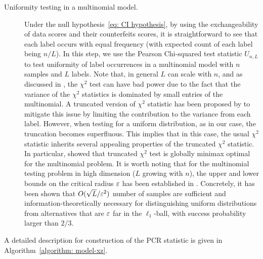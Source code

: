\documentclass[11pt]{article}
\begin{document}
\begin{description}
\item[Uniformity testing in a multinomial model.] Under the null hypothesis~\eqref{eq: CI hypothesis}, by using the exchangeability of data scores and their counterfeits scores, it is straightforward to see that each label occurs with equal frequency (with expected count of each label  being $n/L$). In this step, we use the Pearson Chi-squared test statistic $U_{n,L}$ to test uniformity of label occurrences in a multinomial model with $n$ samples and $L$ labels. Note that, in general $L$ can scale with $n$, and as discussed in  \cite{balakrishnan2019hypothesis}, the $\chi^2$ test can have bad power due to the fact that the variance of the $\chi^2$ statistics is dominated by small entries of the multinomial. A truncated version of $\chi^2$ statistic has been proposed by \cite{balakrishnan2019hypothesis} to mitigate this issue by limiting the contribution to the variance from each label. However, when testing for a uniform distribution, as in our case, the truncation becomes superfluous. This implies that in this case, the usual $\chi^2$ statistic inherits several appealing properties of the truncated $\chi^2$ statistic. In particular, \cite{balakrishnan2019hypothesis} showed that
truncated $\chi^2$ test is globally minimax optimal for the multinomial problem. It is worth noting that for the multinomial testing problem in high dimension ($L$ growing with $n$), the upper and lower bounds on the  critical radius ${\varepsilon}$ has been established in \cite{paninski2008coincidence, valiant2017automatic}. 
Concretely,    
it has been shown that $O(\sqrt{L}/{\varepsilon}^2)$ number of samples are sufficient and information-theoretically necessary for distinguishing uniform distributions from alternatives that are ${\varepsilon}$ far in the $\ell_1$-ball, with success probability larger than $2/3$. 
\end{description}

A detailed description for construction of the PCR statistic is given in Algorithm~\ref{algorithm: model-xz}.
\end{document}
